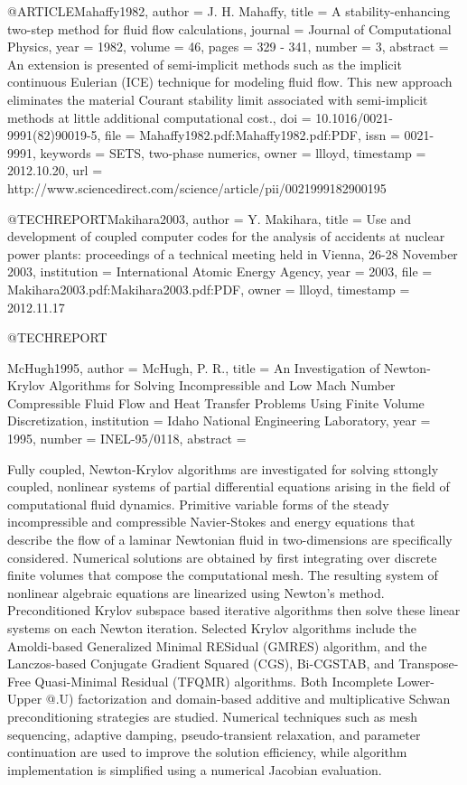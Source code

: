 {@ARTICLE{Mahaffy1982,
  author = {J. H. Mahaffy},
  title = {A stability-enhancing two-step method for fluid flow calculations},
  journal = {Journal of Computational Physics},
  year = {1982},
  volume = {46},
  pages = {329 - 341},
  number = {3},
  abstract = {An extension is presented of semi-implicit methods such as the implicit
	continuous Eulerian (ICE) technique for modeling fluid flow. This
	new approach eliminates the material Courant stability limit associated
	with semi-implicit methods at little additional computational cost.},
  doi = {10.1016/0021-9991(82)90019-5},
  file = {Mahaffy1982.pdf:Mahaffy1982.pdf:PDF},
  issn = {0021-9991},
  keywords = {SETS, two-phase numerics},
  owner = {llloyd},
  timestamp = {2012.10.20},
  url = {http://www.sciencedirect.com/science/article/pii/0021999182900195}
}

@TECHREPORT{Makihara2003,
  author = {Y. Makihara},
  title = {Use and development of coupled computer codes for the analysis of
	accidents at nuclear power plants: proceedings of a technical meeting
	held in {Vienna}, 26-28 {November} 2003},
  institution = {{International Atomic Energy Agency}},
  year = {2003},
  file = {Makihara2003.pdf:Makihara2003.pdf:PDF},
  owner = {llloyd},
  timestamp = {2012.11.17}
}

@TECHREPORT{McHugh1995,
  author = {McHugh, P. R.},
  title = {An Investigation of Newton-Krylov Algorithms for Solving Incompressible
	and Low Mach Number Compressible Fluid Flow and Heat Transfer Problems
	Using Finite Volume Discretization},
  institution = {Idaho National Engineering Laboratory},
  year = {1995},
  number = {INEL-95/0118},
  abstract = {Fully coupled, Newton-Krylov algorithms are investigated for solving
	sttongly coupled, nonlinear systems of partial differential equations
	arising in the field of computational fluid dynamics. Primitive variable
	forms of the steady incompressible and compressible Navier-Stokes
	and energy equations that describe the flow of a laminar Newtonian
	fluid in two-dimensions are specifically considered. Numerical solutions
	are obtained by first integrating over discrete finite volumes that
	compose the computational mesh. The resulting system of nonlinear
	algebraic equations are linearized using Newton's method. Preconditioned
	Krylov subspace based iterative algorithms then solve these linear
	systems on each Newton iteration. Selected Krylov algorithms include
	the Amoldi-based Generalized Minimal RESidual (GMRES) algorithm,
	and the Lanczos-based Conjugate Gradient Squared (CGS), Bi-CGSTAB,
	and Transpose-Free Quasi-Minimal Residual (TFQMR) algorithms. Both
	Incomplete Lower-Upper @.U) factorization and domain-based additive
	and multiplicative Schwan preconditioning strategies are studied.
	Numerical techniques such as mesh sequencing, adaptive damping, pseudo-transient
	relaxation, and parameter continuation are used to improve the solution
	efficiency, while algorithm implementation is simplified using a
	numerical Jacobian evaluation.
	
}}}
